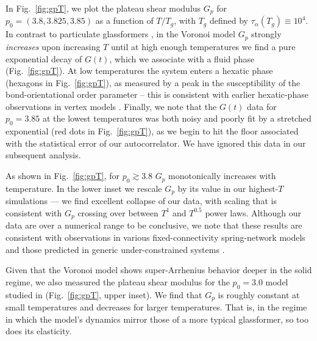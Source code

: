 \documentclass[aps,reprint,superscriptaddress,nofootinbib, notitlepage,prl]{revtex4-2}
\begin{document}
In Fig.~\ref{fig:gpT}, we plot the plateau shear modulus $G_p$ for $p_0=(3.8,3.825,3.85)$ as a function of $T/T_g$, with $T_g$ defined by $\tau_\alpha(T_g)\equiv 10^4$.
In contrast to particulate glassformers \cite{lu2009correlation,flenner2019viscoelastic,puosi2012communication}, in the Voronoi model $G_p$ strongly \emph{increases} upon increasing $T$ until at high enough temperatures we find a pure exponential decay of $G(t)$, which we associate with a fluid phase (Fig.~\ref{fig:gpT}).
At low temperatures the system enters a hexatic phase (hexagons in Fig.~\ref{fig:gpT}), as measured by a peak in the susceptibility of the bond-orientational order parameter \cite{halperin1978theory} -- this is consistent with earlier hexatic-phase observations in vertex models \cite{li2018role}.
Finally, we note that the $G(t)$ data for $p_0=3.85$ at the lowest temperatures was both noisy and poorly fit by a stretched exponential (red dots in Fig.~\ref{fig:gpT}), as we begin to hit the floor associated with the statistical error of our autocorrelator.
We have ignored this data in our subsequent analysis.

As shown in Fig.~\ref{fig:gpT}, for $p_0 \gtrsim 3.8$ $G_p$ monotonically increases with temperature.
In the lower inset we rescale $G_p$ by its value in our highest-$T$ simulations --- we find excellent collapse of our data, with scaling that is consistent with $G_p$ crossing over between $T^1$ and $T^{0.5}$ power laws.
Although our data are over a numerical range to be conclusive, we note that these results are consistent with observations in various fixed-connectivity spring-network models \cite{zhang2016finite,mao2015mechanical,arzash2023mechanical} and those predicted in generic under-constrained systems \cite{lee2023generic,lee2023partition}.

Given that the Voronoi model shows super-Arrhenius behavior deeper in the solid regime, we also measured the plateau shear modulus for the $p_0=3.0$ model studied in \cite{li2021softness} (Fig.~\ref{fig:gpT}, upper inset).
We find that $G_p$ is roughly constant at small temperatures and decreases for larger temperatures. That is, in the regime in which the model's dynamics mirror those of a more typical glassformer, so too does its elasticity.
\end{document}
